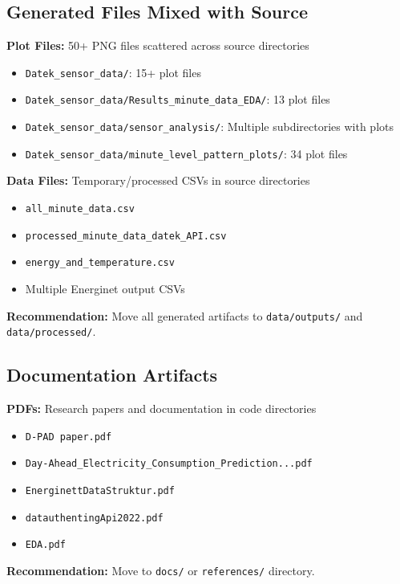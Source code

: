 \documentclass[11pt,a4paper]{article}
\begin{document}
\subsection{Generated Files Mixed with Source}

\textbf{Plot Files:} 50+ PNG files scattered across source directories
\begin{itemize}
    \item \texttt{Datek\_sensor\_data/}: 15+ plot files
    \item \texttt{Datek\_sensor\_data/Results\_minute\_data\_EDA/}: 13 plot files
    \item \texttt{Datek\_sensor\_data/sensor\_analysis/}: Multiple subdirectories with plots
    \item \texttt{Datek\_sensor\_data/minute\_level\_pattern\_plots/}: 34 plot files
\end{itemize}

\textbf{Data Files:} Temporary/processed CSVs in source directories
\begin{itemize}
    \item \texttt{all\_minute\_data.csv}
    \item \texttt{processed\_minute\_data\_datek\_API.csv}
    \item \texttt{energy\_and\_temperature.csv}
    \item Multiple Energinet output CSVs
\end{itemize}

\textbf{Recommendation:} Move all generated artifacts to \texttt{data/outputs/} and \texttt{data/processed/}.

\subsection{Documentation Artifacts}

\textbf{PDFs:} Research papers and documentation in code directories
\begin{itemize}
    \item \texttt{D-PAD paper.pdf}
    \item \texttt{Day-Ahead\_Electricity\_Consumption\_Prediction...pdf}
    \item \texttt{EnerginettDataStruktur.pdf}
    \item \texttt{datauthentingApi2022.pdf}
    \item \texttt{EDA.pdf}
\end{itemize}

\textbf{Recommendation:} Move to \texttt{docs/} or \texttt{references/} directory.
\end{document}
